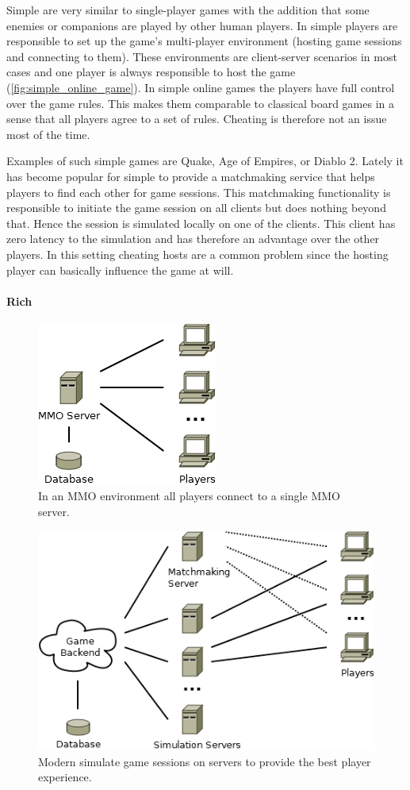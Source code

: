 Simple \ogs{} are very similar to single-player games with the addition that
some enemies or companions are played by other human players. In simple \ogs{}
players are responsible to set up the game's multi-player environment (hosting
game sessions and connecting to them). These environments are client-server
scenarios in most cases and one player is always responsible to host the game
(\autoref{fig:simple_online_game}). In simple online games the players have full
control over the game rules. This makes them comparable to classical board games
in a sense that all players agree to a set of rules. Cheating is therefore not
an issue most of the time.

Examples of such simple games are Quake, Age of Empires, or Diablo 2. Lately it
has become popular for simple \ogs{} to provide a matchmaking service that helps
players to find each other for game sessions. This matchmaking functionality is
responsible to initiate the game session on all clients but does nothing beyond
that. Hence the session is simulated locally on one of the clients. This client
has zero latency to the simulation and has therefore an advantage over the other
players. In this setting cheating hosts are a common problem since the hosting
player can basically influence the game at will.

\paragraph{Rich \ogsucuc{}}

\begin{figure}
  \centering
  \includegraphics[width=.36\linewidth]{images/MMO}
  \caption{In an MMO environment all players connect to a single MMO server.}
  \label{fig:mmo}
\end{figure}
\begin{figure}
  \centering
  \includegraphics[width=.76\linewidth]{images/RichOnlineGame}
  \caption{Modern \og{} simulate game sessions on servers to provide the best
  player experience.}
  \label{fig:rich_online_game}
\end{figure}

